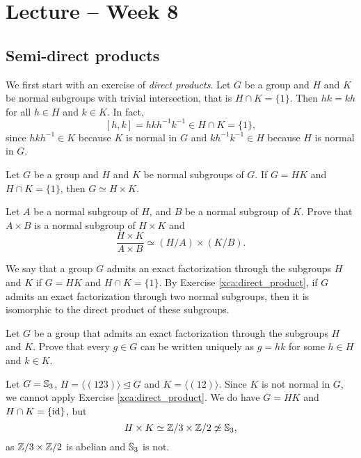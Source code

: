 \section{Lecture -- Week 8}

\subsection{Semi-direct products}

We first start with an exercise of \emph{direct products}. Let $G$ be a group and $H$ and $K$ be normal subgroups with trivial intersection, that is $H\cap K=\{1\}$. 
Then $hk=kh$ for all $h\in H$ and $k\in K$. In fact, 
\[
[h,k]=hkh^{-1}k^{-1}\in H\cap K=\{1\}, 
\]
since $hkh^{-1}\in K$ because $K$ is normal in $G$ and 
$kh^{-1}k^{-1}\in H$ because $H$ is normal in $G$. 

\begin{exercise}
\label{xca:direct_product}
Let $G$ be a group and $H$ and $K$ be normal subgroups of $G$.
If $G=HK$ and $H\cap K=\{1\}$, then $G\simeq H\times K$.
\end{exercise}

\begin{exercise}
\label{xca:direct_product:quotient}
Let $A$ be a normal subgroup of $H$, and $B$ be a normal subgroup of $K$. 
Prove that $A\times B$ is a normal subgroup of
$H\times K$ and 
\[
\frac{H\times K}{A\times B}\simeq(H/A)\times(K/B).
\]
\end{exercise}

We say that a group $G$ admits an exact factorization through 
the subgroups $H$ and $K$ if $G=HK$ and 
$H\cap K=\{1\}$. By Exercise \ref{xca:direct_product}, 
if $G$ admits an exact factorization through two normal subgroups, then 
it is isomorphic to the direct product of these subgroups. 

\begin{exercise}
\label{xca:uniqueness}
    Let $G$ be a group that admits an exact factorization through
    the subgroups $H$ and $K$. Prove that every $g\in G$ can be written 
    uniquely as $g=hk$ for some $h\in H$ and $k\in K$. 
\end{exercise}

\begin{example}
Let $G=\mathbb{S}_3$, $H=\langle (123)\rangle\unlhd G$ and $K=\langle (12)\rangle$. Since
$K$ is not normal in $G$, we cannot apply Exercise \ref{xca:direct_product}. 
We do have $G=HK$ and $H\cap K=\{\operatorname{id}\}$, but 
\[
H\times K\simeq\mathbb{Z}/3\times\mathbb{Z}/2\not\simeq\mathbb{S}_3,
\]
as $\mathbb{Z}/3\times\mathbb{Z}/2$ is abelian and $\mathbb{S}_3$ is not. 
\end{example}

